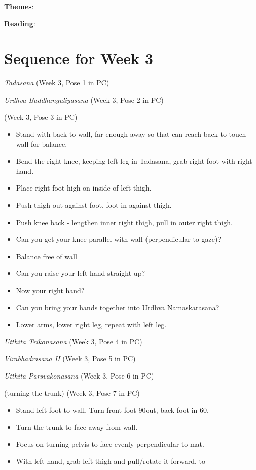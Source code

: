 \documentclass{book}
\newcommand{\pose}[1]{\emph{#1}}
\newcommand{\tad}{\pose{Tadasana}}
\newcommand{\urdbad}{\pose{Urdhva Baddhanguliyasana}}
\newcommand{\uttparsva}{\pose{Utthita Parsvakonasana}}
\newcommand{\utttrik}{\pose{Utthita Trikonasana}}
\newcommand{\virai}{\pose{Virabhdrasana I}}
\newcommand{\viraii}{\pose{Virabhadrasana II}}
\newcommand{\PC}[2]{\hfill(Week #1, Pose #2 in PC)}
\newcommand{\newpose}[1]{{\color{Blue}{#1}}}
\begin{document}
\textbf{Themes}: 

\textbf{Reading}: 

\section{Sequence for Week 3}
\label{chap:seq3}

\begin{poselist}
\item \tad{} \PC{3}{1}
\item \urdbad{} \PC{3}{2}
\item \newpose{vrk{}} \PC{3}{3}
  \begin{itemize}
  \item Stand with back to wall, far enough away so that can reach
    back to touch wall for balance.
  \item Bend the right knee, keeping left leg in Tadasana, grab right
    foot with right hand.
  \item Place right foot high on inside of left thigh.
  \item Push thigh out against foot, foot in against thigh.
  \item Push knee back - lengthen inner right thigh, pull in outer
    right thigh. 
  \item Can you get your knee parallel with wall (perpendicular to
    gaze)? 
  \item Balance free of wall
  \item Can you raise your left hand straight up?
  \item Now your right hand?
  \item Can you bring your hands together into Urdhva Namaskarasana?
  \item Lower arms, lower right leg, repeat with left leg.
  \end{itemize}
\item \utttrik{} \PC{3}{4}
\item \viraii{} \PC{3}{5}
\item \uttparsva{} \PC{3}{6}
\item \newpose{\virai} (turning the trunk) \PC{3}{7}
  \begin{itemize}
  \item Stand left foot to wall. Turn front foot 90\textdegree out,
    back foot in 60\textdegree. 
  \item Turn the trunk to face away from wall.
  \item Focus on turning pelvis to face evenly perpendicular to mat. 
  \item With left hand, grab left thigh and pull/rotate it forward, to

\end{itemize}
\end{poselist}
\end{document}
